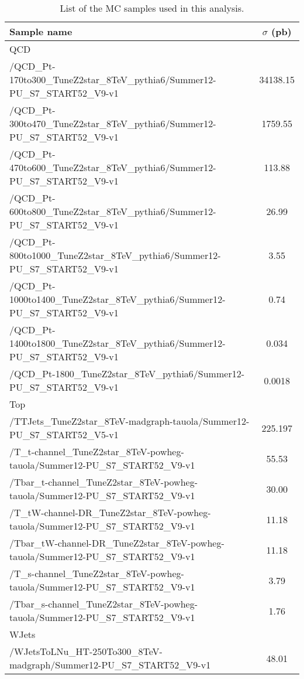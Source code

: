 \begin{table}[!htb]
\begin{center}
\caption{List of the MC samples used in this analysis.}
\label{Tab.MCSamples}
\begin{tabular}{|l|c|}
\hline
Sample name                                                                    & $\sigma$ (pb) \\\hline
QCD &  \\\hline
/QCD\_Pt-170to300\_TuneZ2star\_8TeV\_pythia6/Summer12-PU\_S7\_START52\_V9-v1   & 34138.15\\
/QCD\_Pt-300to470\_TuneZ2star\_8TeV\_pythia6/Summer12-PU\_S7\_START52\_V9-v1   & 1759.55\\
/QCD\_Pt-470to600\_TuneZ2star\_8TeV\_pythia6/Summer12-PU\_S7\_START52\_V9-v1   & 113.88 \\
/QCD\_Pt-600to800\_TuneZ2star\_8TeV\_pythia6/Summer12-PU\_S7\_START52\_V9-v1   & 26.99\\
/QCD\_Pt-800to1000\_TuneZ2star\_8TeV\_pythia6/Summer12-PU\_S7\_START52\_V9-v1  & 3.55\\
/QCD\_Pt-1000to1400\_TuneZ2star\_8TeV\_pythia6/Summer12-PU\_S7\_START52\_V9-v1 & 0.74\\
/QCD\_Pt-1400to1800\_TuneZ2star\_8TeV\_pythia6/Summer12-PU\_S7\_START52\_V9-v1 & 0.034\\
/QCD\_Pt-1800\_TuneZ2star\_8TeV\_pythia6/Summer12-PU\_S7\_START52\_V9-v1       & 0.0018\\\hline
Top &  \\\hline
/TTJets\_TuneZ2star\_8TeV-madgraph-tauola/Summer12-PU\_S7\_START52\_V5-v1      & 225.197\\
/T\_t-channel\_TuneZ2star\_8TeV-powheg-tauola/Summer12-PU\_S7\_START52\_V9-v1  & 55.53\\
/Tbar\_t-channel\_TuneZ2star\_8TeV-powheg-tauola/Summer12-PU\_S7\_START52\_V9-v1     & 30.00\\
/T\_tW-channel-DR\_TuneZ2star\_8TeV-powheg-tauola/Summer12-PU\_S7\_START52\_V9-v1    & 11.18\\
/Tbar\_tW-channel-DR\_TuneZ2star\_8TeV-powheg-tauola/Summer12-PU\_S7\_START52\_V9-v1 & 11.18\\
/T\_s-channel\_TuneZ2star\_8TeV-powheg-tauola/Summer12-PU\_S7\_START52\_V9-v1        & 3.79\\
/Tbar\_s-channel\_TuneZ2star\_8TeV-powheg-tauola/Summer12-PU\_S7\_START52\_V9-v1     & 1.76\\\hline
WJets& \\\hline
/WJetsToLNu\_HT-250To300\_8TeV-madgraph/Summer12-PU\_S7\_START52\_V9-v1 & 48.01 \\

\end{tabular}
\end{center}
\end{table}
